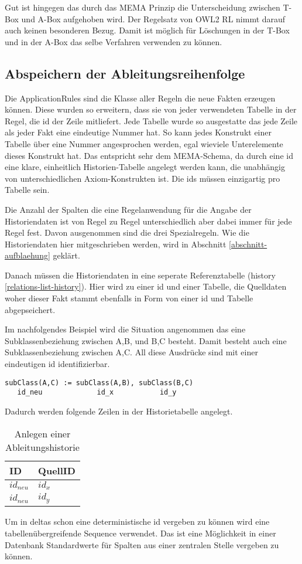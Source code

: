 Gut ist hingegen das durch das MEMA Prinzip die Unterscheidung zwischen T-Box und A-Box aufgehoben wird. Der Regelsatz von OWL2 RL nimmt darauf auch keinen besonderen Bezug. Damit ist möglich für Löschungen in der T-Box und in der A-Box das selbe Verfahren verwenden zu können.

\subsection{Abspeichern der Ableitungsreihenfolge}
Die ApplicationRules sind die Klasse aller Regeln die neue Fakten erzeugen können. Diese wurden so erweitern, dass sie von jeder verwendeten Tabelle in der Regel, die id der Zeile mitliefert. Jede Tabelle wurde so ausgestatte das jede Zeile als jeder Fakt eine eindeutige Nummer hat. So kann jedes Konstrukt einer Tabelle über eine Nummer angesprochen werden, egal wieviele Unterelemente dieses Konstrukt hat. Das entspricht sehr dem MEMA-Schema, da durch eine id eine klare, einheitlich Historien-Tabelle angelegt werden kann, die unabhängig von unterschiedlichen Axiom-Konstrukten ist. Die ids müssen einzigartig pro Tabelle sein.

Die Anzahl der Spalten die eine Regelanwendung für die Angabe der Historiendaten ist von Regel zu Regel unterschiedlich aber dabei immer für jede Regel fest. Davon ausgenommen sind die drei Spezialregeln. Wie die Historiendaten hier mitgeschrieben werden, wird in Abschnitt \ref{abschnitt-aufblaehung} geklärt.

Danach müssen die Historiendaten in eine seperate Referenztabelle (history \ref{relations-list-history}). Hier wird zu einer id und einer Tabelle, die Quelldaten woher dieser Fakt stammt ebenfalls in Form von einer id und Tabelle abgepseichert.

Im nachfolgendes Beispiel wird die Situation angenommen das eine Subklassenbeziehung zwischen A,B, und B,C besteht. Damit besteht auch eine Subklassenbeziehung zwischen A,C. All diese Ausdrücke sind mit einer eindeutigen id identifizierbar.
\begin{verbatim}
subClass(A,C) := subClass(A,B), subClass(B,C)
   id_neu             id_x           id_y
\end{verbatim}

Dadurch werden folgende Zeilen in der Historietabelle angelegt.

\begin{table}[htb]
\begin{center}
\begin{tabular}{l|l}
ID & QuellID \\ \hline
$id_{neu}$ & $id_x$ \\
$id_{neu}$ & $id_y$
\end{tabular}
\end{center}
\caption{Anlegen einer Ableitungshistorie}
\label{table-inference-history}
\end{table}
Um in deltas schon eine deterministische id vergeben zu können wird eine tabellenübergreifende Sequence verwendet. Das ist eine Möglichkeit in einer Datenbank Standardwerte für Spalten aus einer zentralen Stelle vergeben zu können.


